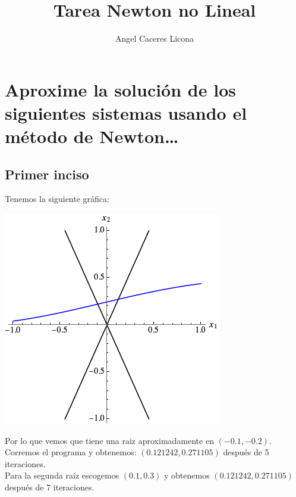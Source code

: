 \documentclass{article}
\begin{document}
\title{Tarea Newton no Lineal}
\author{Angel Caceres Licona}

\maketitle


\section{Aproxime la solución de los siguientes sistemas usando el método de Newton\dots}
\subsection{Primer inciso}
Tenemos la siguiente gráfica:
\begin{center}
    \includegraphics[scale=0.5]{Grafica1.png}    
\end{center}
Por lo que vemos que tiene una raiz aproximadamente en $(-0.1, -0.2)$.\\ 
Corremos el programa y obtenemos: $(0.121242,0.271105)$ después de 5 iteraciones.\\
Para la segunda raíz escogemos $(0.1, 0.3)$ y obtenemos $( 0.121242,0.271105)$ después de 7 iteraciones.
\end{document}
